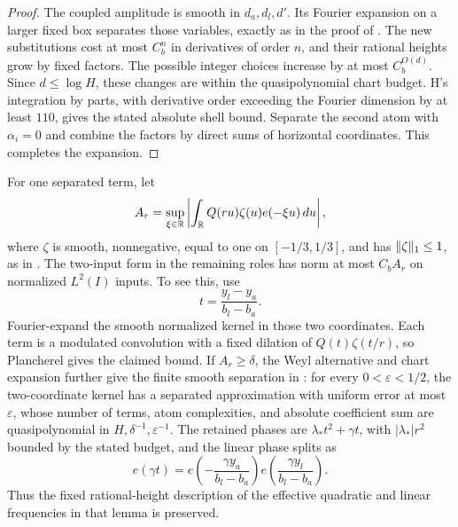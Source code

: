 \begin{proof}
The coupled amplitude is smooth in \(d_a,d_l,d'\).  Its Fourier
expansion on a larger fixed box separates those variables, exactly as
in the proof of \cite[Lemma~4.5]{H}.  The new substitutions cost at
most \(C_b^n\) in derivatives of order \(n\), and their rational
heights grow by fixed factors.  The possible integer choices increase
by at most \(C_b^{O(d)}\).  Since \(d\le\log H\), these changes are
within the quasipolynomial chart budget.  H's integration by parts,
with derivative order exceeding the Fourier dimension by at least
\(110\), gives the stated absolute shell bound.  Separate the second
atom with \(\alpha_i=0\) and combine the factors by direct sums of
horizontal coordinates.  This completes the expansion.
\end{proof}

For one separated term, let
\[
 A_r=\sup_{\xi\in\mathbb R}
       \left|\int_\mathbb R Q(ru)\zeta(u)e(-\xi u)\,du\right|,
\]
where \(\zeta\) is smooth, nonnegative, equal to one on
\([-1/3,1/3]\), and has \(\lVert\zeta\rVert_1\le1\), as in
\cite[Section~5.4]{V}.  The two-input form in the remaining roles
has norm at most \(C_bA_r\) on normalized \(L^2(I)\) inputs.
To see this, use
\[
 t=\frac{y_l-y_a}{b_l-b_a}.
\]
Fourier-expand the smooth normalized kernel in those two coordinates.
Each term is a modulated convolution with a fixed dilation of
\(Q(t)\zeta(t/r)\), so Plancherel gives the claimed bound.  If
\(A_r\ge\delta\), the Weyl alternative and chart expansion further
give the finite smooth separation in \cite[Lemma~4.6]{H}: for every
\(0<\varepsilon<1/2\), the two-coordinate kernel has a separated
approximation with uniform error at most \(\varepsilon\), whose
number of terms, atom complexities, and absolute coefficient sum
are quasipolynomial in \(H,\delta^{-1},\varepsilon^{-1}\).
The retained phases are
\(\lambda_*t^2+\gamma t\), with \(|\lambda_*|r^2\) bounded by the
stated budget, and the linear phase splits as
\[
 e(\gamma t)=e\left(-\frac{\gamma y_a}{b_l-b_a}\right)
              e\left(\frac{\gamma y_l}{b_l-b_a}\right).
\]
Thus the fixed rational-height description of the effective quadratic
and linear frequencies in that lemma is preserved.

